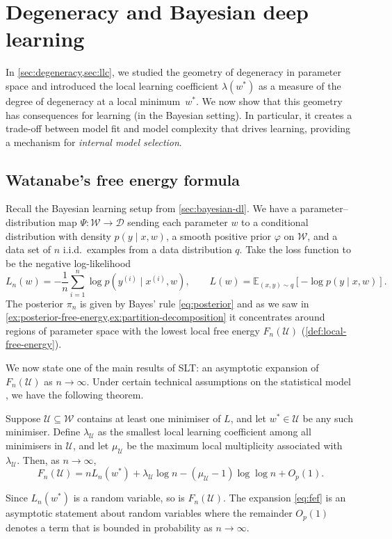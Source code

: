 \documentclass[11pt]{article}
\newcommand{\E}{\mathbb{E}}
\newcommand{\W}{\mathcal{W}}
\newcommand{\D}{\mathcal{D}}
\newcommand{\U}{\mathcal{U}}
\begin{document}
\clearpage
\section{Degeneracy and Bayesian deep learning}
\label{sec:fef}

In \cref{sec:degeneracy,sec:llc}, we studied the geometry of degeneracy in parameter space and introduced the local learning coefficient $\lambda(w^*)$ as a measure of the degree of degeneracy at a local minimum~$w^*$. We now show that this geometry has consequences for learning (in the Bayesian setting). In particular, it creates a trade-off between model fit and model complexity that drives learning, providing a mechanism for \emph{internal model selection}.

\subsection{Watanabe's free energy formula}

Recall the Bayesian learning setup from \cref{sec:bayesian-dl}. We have a parameter--distribution map $\Psi : \W \to \D$ sending each parameter $w$ to a conditional distribution with density $p(y \mid x, w)$, a smooth positive prior $\varphi$ on $\W$, and a data set of $n$ i.i.d.\ examples from a data distribution $q$. Take the loss function to be the negative log-likelihood
\begin{equation*}
    L_n(w) = -\frac{1}{n}\sum_{i=1}^n \log p(y^{(i)} \mid x^{(i)}, w),
    \qquad
    L(w) = \E_{(x,y) \sim q}\!\left[-\log p(y \mid x, w)\right].
\end{equation*}
The posterior $\pi_n$ is given by Bayes' rule \eqref{eq:posterior} and as we saw in \cref{ex:posterior-free-energy,ex:partition-decomposition} it concentrates around regions of parameter space with the lowest local free energy $F_n(\U)$ (\cref{def:local-free-energy}).

We now state one of the main results of SLT: an asymptotic expansion of $F_n(\U)$ as $n \to \infty$. Under certain technical assumptions on the statistical model \citetext{\citealp{Watanabe2018}; see \citealp[][\S 2.3.1]{Lau2025} for a summary}, we have the following theorem.


\begin{theorem}
\label{thm:fef}
    Suppose $\U \subseteq \W$ contains at least one minimiser of $L$, and let $w^* \in \U$ be any such minimiser. Define $\lambda_{\U}$ as the smallest local learning coefficient among all minimisers in $\U$, and let $\mu_{\U}$ be the maximum local multiplicity associated with $\lambda_{\U}$. Then, as $n \to \infty$,
    \begin{equation}
    \label{eq:fef}
        F_n(\U) = nL_n(w^*) + \lambda_{\U} \log n 
              - (\mu_{\U} - 1)\log \log n + O_p(1).
    \end{equation}
\end{theorem}
\begin{remark}
    Since $L_n(w^*)$ is a random variable, so is $F_n(\U)$. The expansion \cref{eq:fef} is an asymptotic statement about random variables where the remainder $O_p(1)$ denotes a term that is bounded in probability as $n \to \infty$.
\end{remark}
\end{document}

